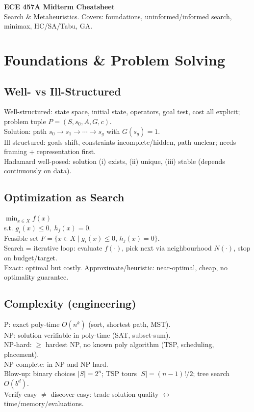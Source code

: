 \begin{tcolorbox}[cheatbox]
\textbf{ECE 457A Midterm Cheatsheet}\\
Search \& Metaheuristics. Covers: foundations, uninformed/informed search, minimax, HC/SA/Tabu, GA.
\end{tcolorbox}

\section{Foundations \& Problem Solving}

\subsection*{Well- vs Ill-Structured}
Well-structured: state space, initial state, operators, goal test, cost all explicit; problem tuple \( P=(S,s_0,A,G,c) \).\\
Solution: path \( s_0\!\to\!s_1\!\to\!\cdots\!\to\!s_g \) with \( G(s_g)=1 \).\\
Ill-structured: goals shift, constraints incomplete/hidden, path unclear; needs framing + representation first.\\
Hadamard well-posed: solution (i) exists, (ii) unique, (iii) stable (depends continuously on data).

\subsection*{Optimization as Search}
\(\min_{x\in X} f(x)\)\\
s.t. \(g_i(x)\le 0,\; h_j(x)=0\).\\
Feasible set \(F=\{x\in X\mid g_i(x)\le0,\,h_j(x)=0\}\).\\
Search = iterative loop: evaluate \(f(\cdot)\), pick next via neighbourhood \(N(\cdot)\), stop on budget/target.\\
Exact: optimal but costly. Approximate/heuristic: near-optimal, cheap, no optimality guarantee.

\subsection*{Complexity (engineering)}
P: exact poly-time \( O(n^k) \) (sort, shortest path, MST).\\
NP: solution verifiable in poly-time (SAT, subset-sum).\\
NP-hard: \(\ge\) hardest NP, no known poly algorithm (TSP, scheduling, placement).\\
NP-complete: in NP and NP-hard.\\
Blow-up: binary choices \( |S|=2^n \); TSP tours \( |S|=(n-1)!/2 \); tree search \( O(b^d) \).\\
Verify-easy \(\neq\) discover-easy: trade solution quality \(\leftrightarrow\) time/memory/evaluations.

